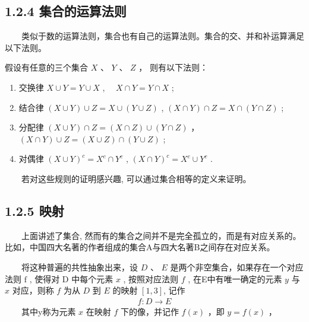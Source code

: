 \documentclass[a4paper,11pt,english]{sphinxmanual}
\begin{document}
\subsection{1.2.4 集合的运算法则}
\label{\detokenize{rst/_u9644_u5f551_u91cf_u5b50_u8ba1_u7b97_u6570_u5b66_u57fa_u78401:id6}}
\sphinxAtStartPar
​  类似于数的运算法则，集合也有自己的运算法则。集合的交、并和补运算满足以下法则。

\sphinxAtStartPar
假设有任意的三个集合  \(X\) 、 \(Y\) 、 \(Z\) ， 则有以下法则：
\begin{enumerate}
%
\item {} 
\sphinxAtStartPar
交换律  \(X \cup Y=Y \cup X\) ,  \(\quad X \cap Y=Y \cap X\) ;

\item {} 
\sphinxAtStartPar
结合律  \((X \cup Y) \cup Z=X \cup(Y \cup Z)\) , \((X \cap Y) \cap Z=X \cap(Y \cap Z)\) ;

\item {} 
\sphinxAtStartPar
分配律  \((X \cup Y) \cap Z=(X \cap Z) \cup(Y \cap Z)\) ， \((X \cap Y) \cup Z=(X \cup Z) \cap(Y \cup Z)\) ;

\item {} 
\sphinxAtStartPar
对偶律  \((X \cup Y)^{c}=X^{c} \cap Y^{c}\) , \((X \cap Y)^{c}=X^{c} \cup Y^{c}\) .

\end{enumerate}

\sphinxAtStartPar
  若对这些规则的证明感兴趣, 可以通过集合相等的定义来证明。


\subsection{1.2.5 映射}
\label{\detokenize{rst/_u9644_u5f551_u91cf_u5b50_u8ba1_u7b97_u6570_u5b66_u57fa_u78401:id7}}
\sphinxAtStartPar
​  上面讲述了集合, 然而有的集合之间并不是完全孤立的，而是有对应关系的。比如，中国四大名著的作者组成的集合A与四大名著B之间存在对应关系。

\sphinxAtStartPar
​  ​将这种普遍的共性抽象出来，设 \(D\) 、 \(E\) 是两个非空集合，如果存在一个对应法则  \(\mathrm{f}\) , 使得对  \(\mathrm{D}\) 中每个元素  \(x\) , 按照对应法则  \(f\) , 在E中有唯一确定的元素  \(y\) 与  \(x\) 对应，则称 \(f\) 为从  \(D\) 到 \(E\) 的映射  \([1, 3]\), 记作
\begin{equation*}
\begin{split}f: D \rightarrow E\end{split}
\end{equation*}
\sphinxAtStartPar
​  其中y称为元素  \(x\) 在映射  \(f\) 下的像，并记作  \(f(x)\) ，即  \(y=f(x)\) ，
\end{document}
